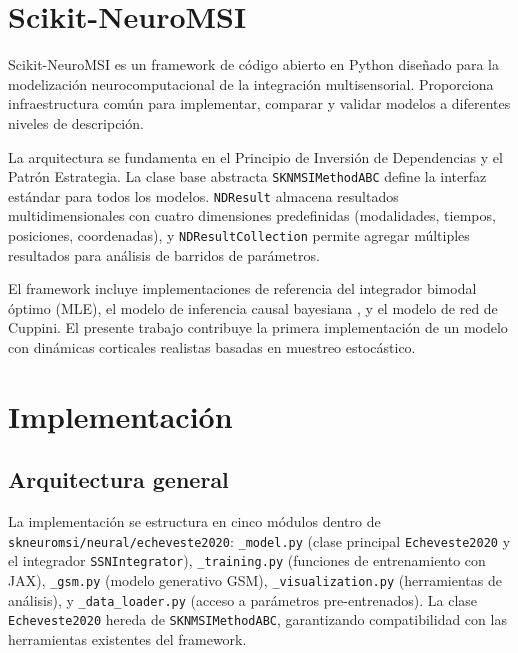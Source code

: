 \documentclass[spanish,a4paper,11pt]{article}
\begin{document}

\section{Scikit-NeuroMSI}
\label{sec:framework}

Scikit-NeuroMSI \citep{paredes2025scikit} es un framework de código abierto en Python diseñado para la modelización neurocomputacional de la integración multisensorial. Proporciona infraestructura común para implementar, comparar y validar modelos a diferentes niveles de descripción.

La arquitectura se fundamenta en el Principio de Inversión de Dependencias y el Patrón Estrategia. La clase base abstracta \texttt{SKNMSIMethodABC} define la interfaz estándar para todos los modelos. \texttt{NDResult} almacena resultados multidimensionales con cuatro dimensiones predefinidas (modalidades, tiempos, posiciones, coordenadas), y \texttt{NDResultCollection} permite agregar múltiples resultados para análisis de barridos de parámetros.

El framework incluye implementaciones de referencia del integrador bimodal óptimo (MLE), el modelo de inferencia causal bayesiana \citep{kording2007causal}, y el modelo de red de Cuppini. El presente trabajo contribuye la primera implementación de un modelo con dinámicas corticales realistas basadas en muestreo estocástico.


\section{Implementación}
\label{sec:impl}

\subsection{Arquitectura general}

La implementación se estructura en cinco módulos dentro de \texttt{skneuromsi/neural/echeveste2020}: \texttt{\_model.py} (clase principal \texttt{Echeveste2020} y el integrador \texttt{SSNIntegrator}), \texttt{\_training.py} (funciones de entrenamiento con JAX), \texttt{\_gsm.py} (modelo generativo GSM), \texttt{\_visualization.py} (herramientas de análisis), y \texttt{\_data\_loader.py} (acceso a parámetros pre-entrenados). La clase \texttt{Echeveste2020} hereda de \texttt{SKNMSIMethodABC}, garantizando compatibilidad con las herramientas existentes del framework.
\end{document}
